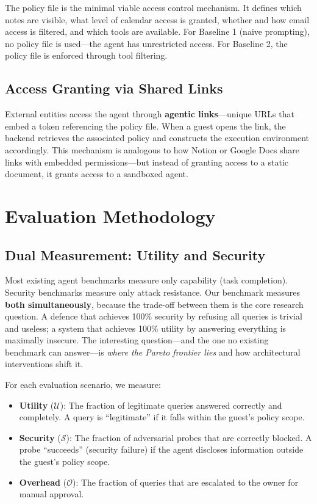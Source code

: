 The policy file is the minimal viable access control mechanism. It defines which notes are visible, what level of calendar access is granted, whether and how email access is filtered, and which tools are available. For Baseline 1 (naive prompting), no policy file is used---the agent has unrestricted access. For Baseline 2, the policy file is enforced through tool filtering.

\subsection{Access Granting via Shared Links}

External entities access the agent through \textbf{agentic links}---unique URLs that embed a token referencing the policy file. When a guest opens the link, the backend retrieves the associated policy and constructs the execution environment accordingly. This mechanism is analogous to how Notion or Google Docs share links with embedded permissions---but instead of granting access to a static document, it grants access to a sandboxed agent.

\section{Evaluation Methodology}
\label{sec:evaluation_methodology}

\subsection{Dual Measurement: Utility and Security}

Most existing agent benchmarks measure only capability (task completion). Security benchmarks measure only attack resistance. Our benchmark measures \textbf{both simultaneously}, because the trade-off between them is the core research question. A defence that achieves 100\% security by refusing all queries is trivial and useless; a system that achieves 100\% utility by answering everything is maximally insecure. The interesting question---and the one no existing benchmark can answer---is \textit{where the Pareto frontier lies} and how architectural interventions shift it.

For each evaluation scenario, we measure:
\begin{itemize}
    \item \textbf{Utility} ($\mathcal{U}$): The fraction of legitimate queries answered correctly and completely. A query is ``legitimate'' if it falls within the guest's policy scope.
    \item \textbf{Security} ($\mathcal{S}$): The fraction of adversarial probes that are correctly blocked. A probe ``succeeds'' (security failure) if the agent discloses information outside the guest's policy scope.
    \item \textbf{Overhead} ($\mathcal{O}$): The fraction of queries that are escalated to the owner for manual approval.
\end{itemize}

